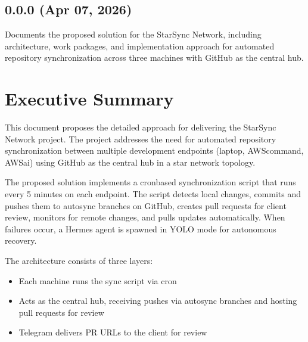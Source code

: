 \documentclass[letterpaper,10pt,openany,oneside,english]{sphinxmanual}
\begin{document}
\subsection{0.0.0 (Apr 07, 2026)}
\label{\detokenize{releasenotes:apr-07-2026}}
\sphinxAtStartPar
{}

\sphinxAtStartPar
Documents the proposed solution for the StarSync Network, including architecture,
work packages, and implementation approach for automated repository synchronization
across three machines with GitHub as the central hub.

\sphinxstepscope


\section{Executive Summary}
\label{\detokenize{executive_summary:executive-summary}}\label{\detokenize{executive_summary::doc}}
\sphinxAtStartPar
This document proposes the detailed approach for delivering the StarSync Network
project. The project addresses the need for automated repository synchronization
between multiple development endpoints (laptop, AWS\sphinxhyphen{}command, AWS\sphinxhyphen{}ai) using GitHub
as the central hub in a star network topology.

\sphinxAtStartPar
The proposed solution implements a cron\sphinxhyphen{}based synchronization script that runs every
5 minutes on each endpoint. The script detects local changes, commits and pushes them
to autosync branches on GitHub, creates pull requests for client review, monitors for
remote changes, and pulls updates automatically. When failures occur, a Hermes agent
is spawned in YOLO mode for autonomous recovery.

\sphinxAtStartPar
The architecture consists of three layers:
\begin{itemize}
\item {} 
\sphinxAtStartPar
{} \textendash{} Each machine runs the sync script via cron

\item {} 
\sphinxAtStartPar
{} \textendash{} Acts as the central hub, receiving pushes via autosync
branches and hosting pull requests for review

\item {} 
\sphinxAtStartPar
{} \textendash{} Telegram delivers PR URLs to the client for review

\end{itemize}
\end{document}
